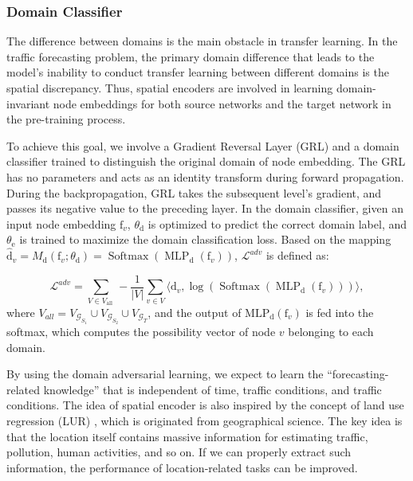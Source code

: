 \documentclass[sigconf]{acmart}
\theoremstyle{definition}
\begin{document}
\subsubsection{Domain Classifier}
The difference between domains is the main obstacle in transfer learning. In the traffic forecasting problem, the primary domain difference that leads to the model's inability to conduct transfer learning between different domains is the spatial discrepancy. Thus, spatial encoders are involved in learning domain-invariant node embeddings for both source networks and the target network in the pre-training process.


To achieve this goal, we involve a Gradient Reversal Layer (GRL) \cite{ganin2015unsupervised} and a domain classifier trained to distinguish the original domain of node embedding. The GRL has no parameters and acts as an identity transform during forward propagation. During the backpropagation, GRL takes the subsequent level's gradient, and passes its negative value to the preceding layer. 
In the domain classifier, given an input node embedding $\mathrm{f}_v$, $\theta_{\mathrm{d}}$ is optimized to predict the correct domain label, and $\theta_{\mathrm{e}}$ is trained to maximize the domain classification loss. Based on the mapping $\widehat{\mathrm{d}}_v={M}_\mathrm{d}\left(\mathrm{f}_v  ; \theta_\mathrm{d}\right) = \operatorname{Softmax} \left( \operatorname{MLP}_{\mathrm{d}}\left(\mathrm{f}_{v}\right)\right)$, $\mathcal{L}^{adv}$ is defined as:


\begin{equation}\label{eq11}
{\mathcal{L}}^{a d v}=\sum_{V \in V_{\text {all }}}-\frac{1}{|V|} \sum_{v \in V}  \langle \mathrm{d}_{v}, \log \left(\operatorname{Softmax}\left(\operatorname{MLP}_{\mathrm{d}}\left(\mathrm{f}_{v}\right)\right)\right) \rangle,
\end{equation}
where $V_{all}=V_{\mathcal{G}_{S_1}} \cup V_{\mathcal{G}_{S_2}} \cup V_{\mathcal{G}_{T}}$, and the output of $\mathrm{MLP}_\mathrm{d}(\mathrm{f}_v)$ is fed into the softmax, which computes the possibility vector of node $v$ belonging to each domain.

By using the domain adversarial learning, we expect to learn the ``forecasting-related knowledge'' that is independent of time, traffic conditions, and traffic conditions. The idea of spatial encoder is also inspired by the concept of land use regression (LUR) \cite{steininger2020maplur}, which is originated from geographical science. The key idea is that the location itself contains massive information for estimating traffic, pollution, human activities, and so on. If we can properly extract such information, the performance of location-related tasks can be improved. 
\end{document}
